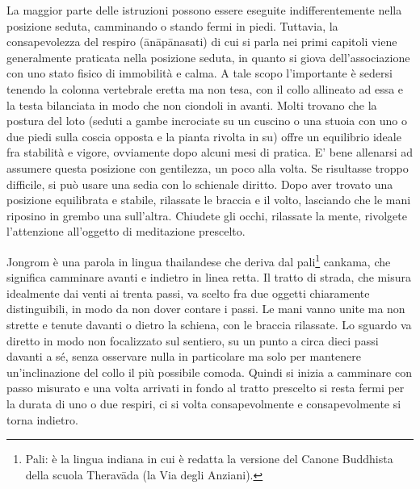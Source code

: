 
La maggior parte delle istruzioni possono essere eseguite
indifferentemente nella posizione seduta, camminando o stando fermi in
piedi. Tuttavia, la consapevolezza del respiro (ānāpānasati) di cui si
parla nei primi capitoli viene generalmente praticata nella posizione
seduta, in quanto si giova dell'associazione con uno stato fisico di
immobilità e calma. A tale scopo l'importante è sedersi tenendo la
colonna vertebrale eretta ma non tesa, con il collo allineato ad essa e
la testa bilanciata in modo che non ciondoli in avanti. Molti trovano
che la postura del loto (seduti a gambe incrociate su un cuscino o una
stuoia con uno o due piedi sulla coscia opposta e la pianta rivolta in
su) offre un equilibrio ideale fra stabilità e vigore, ovviamente dopo
alcuni mesi di pratica. E' bene allenarsi ad assumere questa posizione
con gentilezza, un poco alla volta. Se risultasse troppo difficile, si
può usare una sedia con lo schienale diritto. Dopo aver trovato una
posizione equilibrata e stabile, rilassate le braccia e il volto,
lasciando che le mani riposino in grembo una sull'altra. Chiudete gli
occhi, rilassate la mente, rivolgete l'attenzione all'oggetto di
meditazione prescelto.

Jongrom è una parola in lingua thailandese che deriva dal
pali\footnote{Pali: è la lingua indiana in cui è redatta la versione
del Canone Buddhista della scuola Theravāda (la Via degli Anziani).}
cankama, che significa camminare avanti e indietro in
linea retta. Il tratto di strada, che misura idealmente dai venti ai
trenta passi, va scelto fra due oggetti chiaramente distinguibili, in
modo da non dover contare i passi. Le mani vanno unite ma non strette e
tenute davanti o dietro la schiena, con le braccia rilassate. Lo sguardo
va diretto in modo non focalizzato sul sentiero, su un punto a circa
dieci passi davanti a sé, senza osservare nulla in particolare ma solo
per mantenere un'inclinazione del collo il più possibile comoda. Quindi
si inizia a camminare con passo misurato e una volta arrivati in fondo
al tratto prescelto si resta fermi per la durata di uno o due respiri,
ci si volta consapevolmente e consapevolmente si torna indietro.


